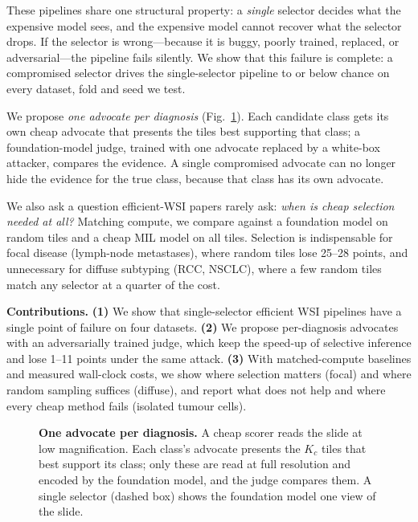 \documentclass[10pt,twocolumn]{article}
\begin{document}
These pipelines share one structural property: a \emph{single} selector decides what the expensive model sees, and the expensive model cannot recover what the selector drops. If the selector is wrong---because it is buggy, poorly trained, replaced, or adversarial---the pipeline fails silently. We show that this failure is complete: a compromised selector drives the single-selector pipeline to or below chance on every dataset, fold and seed we test.

We propose \emph{one advocate per diagnosis} (Fig.~\ref{fig:method}). Each candidate class gets its own cheap advocate that presents the tiles best supporting that class; a foundation-model judge, trained with one advocate replaced by a white-box attacker, compares the evidence. A single compromised advocate can no longer hide the evidence for the true class, because that class has its own advocate.

We also ask a question efficient-WSI papers rarely ask: \emph{when is cheap selection needed at all?} Matching compute, we compare against a foundation model on random tiles and a cheap MIL model on all tiles. Selection is indispensable for focal disease (lymph-node metastases), where random tiles lose 25--28 points, and unnecessary for diffuse subtyping (RCC, NSCLC), where a few random tiles match any selector at a quarter of the cost.

\noindent\textbf{Contributions.} \textbf{(1)} We show that single-selector efficient WSI pipelines have a single point of failure on four datasets. \textbf{(2)} We propose per-diagnosis advocates with an adversarially trained judge, which keep the speed-up of selective inference and lose 1--11 points under the same attack. \textbf{(3)} With matched-compute baselines and measured wall-clock costs, we show where selection matters (focal) and where random sampling suffices (diffuse), and report what does not help and where every cheap method fails (isolated tumour cells).

\begin{figure}[t]\centering
\resizebox{\columnwidth}{!}{}
\caption{\textbf{One advocate per diagnosis.} A cheap scorer reads the slide at low magnification. Each class's advocate presents the $K_c$ tiles that best support its class; only these are read at full resolution and encoded by the foundation model, and the judge compares them. A single selector (dashed box) shows the foundation model one view of the slide.}\label{fig:method}
\end{figure}
\end{document}
